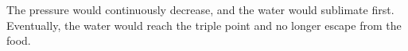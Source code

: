 The pressure would continuously decrease, and the water would sublimate first.  
Eventually, the water would reach the triple point and no longer escape from the food.